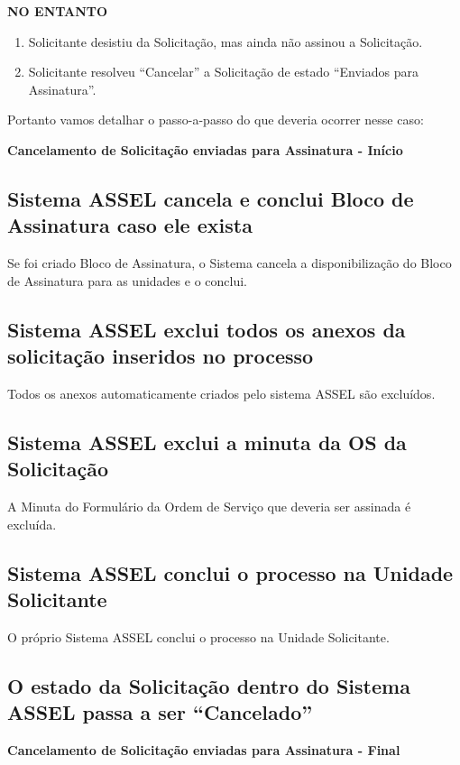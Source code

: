 \large
\begin{center}
	\textbf{NO ENTANTO}
\end{center}
\normalsize

\begin{enumerate}
	\item Solicitante desistiu da Solicitação, mas ainda não assinou a Solicitação.
	
	\item Solicitante resolveu ``Cancelar'' a Solicitação de estado ``Enviados para Assinatura''.	
\end{enumerate}


Portanto vamos detalhar o passo-a-passo do que deveria ocorrer nesse caso:

\Large
\begin{center}
	\textbf{Cancelamento de Solicitação enviadas para Assinatura - Início}
\end{center}
\normalsize


\subsection{Sistema ASSEL cancela e conclui Bloco de Assinatura caso ele exista}

Se foi criado Bloco de Assinatura, o Sistema cancela a disponibilização do Bloco de Assinatura para as unidades e o conclui.

\subsection{Sistema ASSEL exclui todos os anexos da solicitação inseridos no processo}

Todos os anexos automaticamente criados pelo sistema ASSEL são excluídos. 

\subsection{Sistema ASSEL exclui a minuta da OS da Solicitação}

A Minuta do Formulário da Ordem de Serviço que deveria ser assinada é excluída.

\subsection{Sistema ASSEL conclui o processo na Unidade Solicitante}

O próprio Sistema ASSEL conclui o processo na Unidade Solicitante.

\subsection{O estado da Solicitação dentro do Sistema ASSEL passa a ser ``Cancelado''}

\Large
\begin{center}
	\textbf{Cancelamento de Solicitação enviadas para Assinatura - Final}
\end{center}
\normalsize